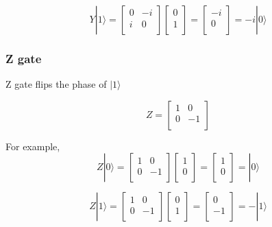 $$ Y|1\rangle = \begin{bmatrix}
0 & -i \\
i & 0 \\
\end{bmatrix} 
\left[
\begin{array}{c}
0 \\
1  \\
\end{array}
\right]
= \left[
\begin{array}{c}
-i \\
0 \\
\end{array}
\right]
= -i|0\rangle
$$

\subsubsection{Z gate}

Z gate flips the phase of $ |1\rangle$

$$ Z = \begin{bmatrix}
1 & 0 \\
0 & -1 \\
\end{bmatrix}
$$

For example,
$$ Z|0\rangle = \begin{bmatrix}
1 & 0 \\
0 & -1 \\
\end{bmatrix} 
\left[
\begin{array}{c}
1 \\
0 \\
\end{array}
\right]
= \left[
\begin{array}{c}
1 \\
0 \\
\end{array}
\right]
= |0\rangle
$$

$$ Z|1\rangle = \begin{bmatrix}
1 & 0 \\
0 & -1 \\
\end{bmatrix} 
\left[
\begin{array}{c}
0 \\
1  \\
\end{array}
\right]
= \left[
\begin{array}{c}
0 \\
-1 \\
\end{array}
\right]
= -|1\rangle
$$

